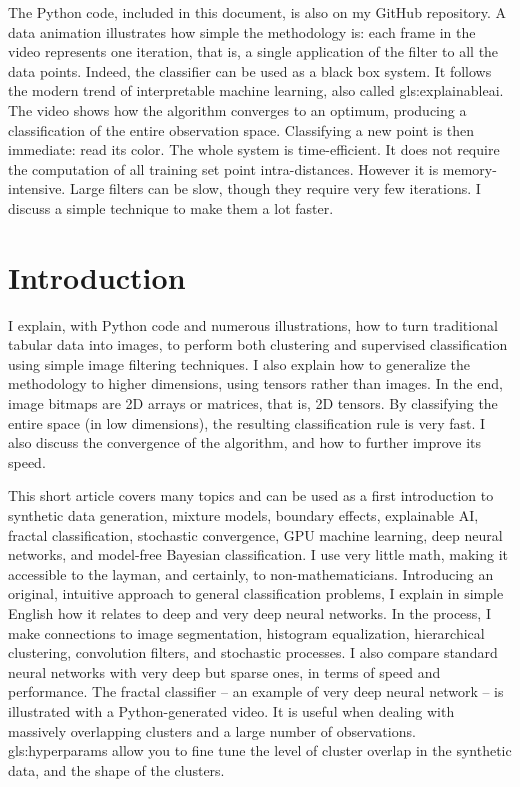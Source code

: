 \documentclass[oneside,10pt]{book}
\begin{document}
The Python code, included in this document, is also on my GitHub repository. 
A data animation illustrates how simple the methodology is: each frame in the video represents one iteration, that is, a single application of the filter to all the data points. Indeed, the classifier can be used as a black box system. It follows the modern trend of interpretable machine learning, also called \gls{gls:explainableai}. The video shows how the algorithm converges to an optimum, producing a classification of the entire observation space. Classifying a new point is then immediate: read its color. The whole system is time-efficient. It does not require the computation of all training set point intra-distances. However it is memory-intensive. Large filters can be slow, though they require very few iterations. I discuss a simple technique to make them a lot faster. 


\hypersetup{linkcolor=red}


\section{Introduction}\label{vizintro}

I explain, with Python code and numerous illustrations, how to turn traditional tabular data into images, to perform both clustering and supervised classification using simple image filtering techniques. I also explain how to generalize
the methodology to higher dimensions, using tensors rather than images. In the end, image bitmaps are 2D arrays or matrices, that is, 2D tensors. 
By classifying the entire space (in low dimensions), the resulting classification rule is very fast. I also discuss the convergence of the algorithm, and how to further improve its speed.

This short article covers many topics and can be used as a first introduction to synthetic data generation, mixture models, boundary effects, explainable AI, fractal classification, stochastic convergence, GPU machine learning, deep neural networks, and model-free Bayesian classification. I use very little math, making it 
accessible to the layman, and certainly, to non-mathematicians.  Introducing an original, intuitive approach to general classification problems, I explain in simple English how it 
relates to deep and very deep neural networks. In the process, I make connections to image segmentation, histogram equalization, hierarchical clustering, 
convolution filters, and stochastic processes. I also compare standard neural networks with very deep but sparse ones, in terms of speed and performance. 
The fractal classifier -- an example of very deep neural network -- is illustrated with a Python-generated video. It is useful when dealing with massively overlapping clusters and a large number
of observations. \Glspl{gls:hyperparam} allow you to fine tune the level of cluster overlap in the synthetic data, and the shape of the clusters.
\end{document}
